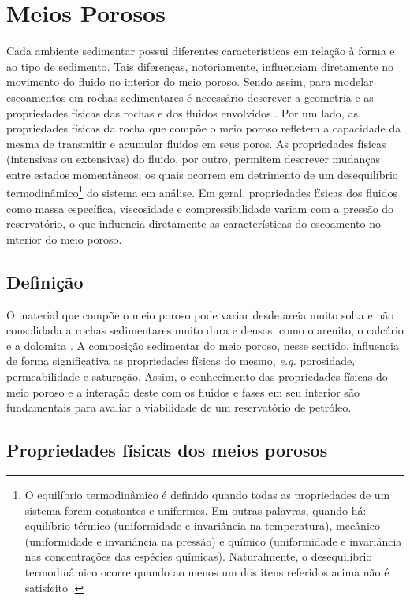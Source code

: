 \section{Meios Porosos}

Cada ambiente sedimentar possui diferentes características em relação à forma e ao tipo de sedimento. Tais diferenças, notoriamente, influenciam diretamente no movimento do fluido no interior do meio poroso. Sendo assim, para modelar escoamentos em rochas sedimentares é necessário descrever a geometria e as propriedades físicas das rochas e dos fluidos envolvidos \cite{Ahmed2010}. Por um lado, as propriedades físicas da rocha que compõe o meio poroso refletem a capacidade da mesma de transmitir e acumular fluidos em seus poros. As propriedades físicas (intensivas ou extensivas) do fluido, por outro, permitem descrever mudanças entre estados momentâneos, os quais ocorrem em detrimento de um desequilíbrio termodinâmico\footnote{O equilíbrio termodinâmico é definido quando todas as propriedades de um sistema forem constantes e uniformes. Em outras palavras, quando há: equilíbrio térmico (uniformidade e invariância na temperatura), mecânico (uniformidade e invariância na pressão) e químico (uniformidade e invariância nas concentrações das espécies químicas). Naturalmente, o desequilíbrio termodinâmico ocorre quando ao menos um dos itens referidos acima não é satisfeito \cite{Borgnakke2018}.} do sistema em análise. Em geral, propriedades físicas dos fluidos como massa específica, viscosidade e compressibilidade variam com a pressão do reservatório, o que influencia diretamente as características do escoamento no interior do meio poroso.  

\subsection{Definição}

O material que compõe o meio poroso pode variar desde areia muito solta e não consolidada a rochas sedimentares muito dura e densas, como o arenito, o calcário e a dolomita \cite{Ahmed2010}. A composição sedimentar do meio poroso, nesse sentido, influencia de forma significativa as propriedades físicas do mesmo, \textit{e.g.} porosidade, permeabilidade e saturação. Assim, o conhecimento das propriedades físicas do meio poroso e a interação deste com os fluidos e fases em seu interior são fundamentais para avaliar a viabilidade de um reservatório de petróleo.   

\subsection{Propriedades físicas dos meios porosos}

